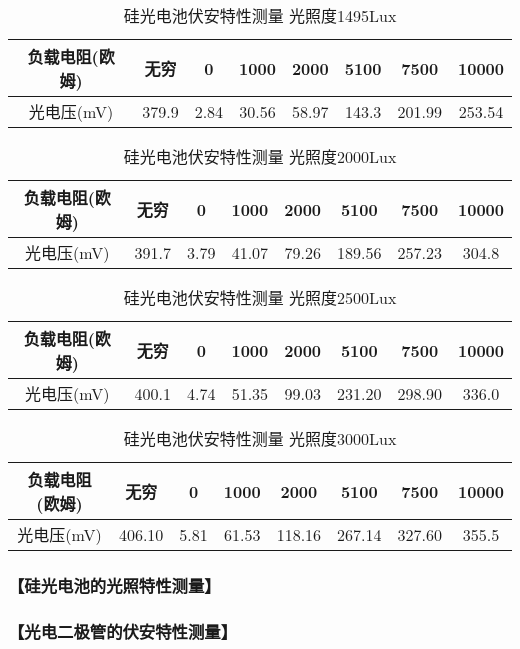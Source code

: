 \documentclass{ctexart}
\let\oldsubsubsection\subsubsection
\renewcommand{\subsubsection}[1]{\oldsubsubsection{\!\!\!\!\!\!【#1】}}
\begin{document}
\begin{table*}[!htbp]
  \centering
  \begin{tabular}{|c|c|c|c|c|c|c|c|}
    \hline
    负载电阻(欧姆) &无穷&0&1000&2000&5100&7500&10000\\\hline
    光电压(mV) &379.9&2.84&30.56&58.97&143.3&201.99&253.54\\\hline
  \end{tabular}
  \caption{硅光电池伏安特性测量 光照度1495Lux}
\end{table*}

\begin{table*}[!htbp]
  \centering
  \begin{tabular}{|c|c|c|c|c|c|c|c|}
    \hline
    负载电阻(欧姆) &无穷&0&1000&2000&5100&7500&10000\\\hline
    光电压(mV) &391.7&3.79&41.07&79.26&189.56&257.23&304.8\\\hline
  \end{tabular}
  \caption{硅光电池伏安特性测量 光照度2000Lux}
\end{table*}

\begin{table*}[!htbp]
  \centering
  \begin{tabular}{|c|c|c|c|c|c|c|c|}
    \hline
    负载电阻(欧姆) &无穷&0&1000&2000&5100&7500&10000\\\hline
    光电压(mV) &400.1&4.74&51.35&99.03&231.20&298.90&336.0\\\hline
  \end{tabular}
  \caption{硅光电池伏安特性测量 光照度2500Lux}
\end{table*}

\begin{table*}[!htbp]
  \centering
  \begin{tabular}{|c|c|c|c|c|c|c|c|}
    \hline
    负载电阻(欧姆) &无穷&0&1000&2000&5100&7500&10000\\\hline
    光电压(mV) &406.10&5.81&61.53&118.16&267.14&327.60&355.5\\\hline
  \end{tabular}
  \caption{硅光电池伏安特性测量 光照度3000Lux}
\end{table*}

\subsubsection{硅光电池的光照特性测量}



\subsubsection{光电二极管的伏安特性测量}
\end{document}
